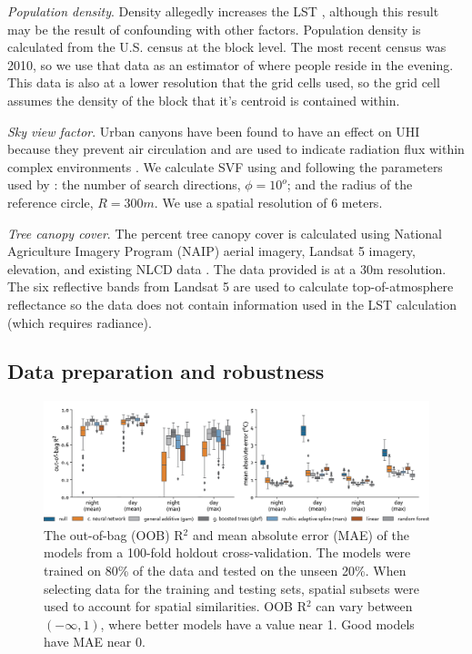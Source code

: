 \documentclass[final,3p,times,twocolumn,sort&compress]{elsarticle}
\begin{document}
\textit{Population density}. 
Density allegedly increases the LST \cite{Li2017-yl, Peng2018-cp}, although this result may be the result of confounding with other factors. 
Population density is calculated from the U.S. census at the block level. 
The most recent census was 2010, so we use that data as an estimator of where people reside in the evening. 
This data is also at a lower resolution that the grid cells used, so the grid cell assumes the density of the block that it's centroid is contained within.

\textit{Sky view factor}. Urban canyons have been found to have an effect on UHI because they prevent air circulation \cite{Landsberg1981-mq, Chun2017-mm} and are used to indicate radiation flux within complex environments \cite{Matzarakis2007-xy}. We calculate SVF using \cite{Van_doninck2018-ib} and following the parameters used by \cite{Chun2017-mm}: the number of search directions, $\phi=10^o$; and the radius of the reference circle, $R=300m$. We use a spatial resolution of 6 meters.

\textit{Tree canopy cover}. 
The percent tree canopy cover is calculated using National Agriculture Imagery Program (NAIP) aerial imagery, Landsat 5 imagery, elevation, and existing NLCD data \cite{Coulston2012-uu, Homer2015-ce}. 
The data provided is at a 30m resolution. 
The six reflective bands from Landsat 5 are used to calculate top-of-atmosphere reflectance \cite{Coulston2012-uu} so the data does not contain information used in the LST calculation (which requires radiance). 

\subsection{Data preparation and robustness}
\begin{figure}
    \centering
    \includegraphics[width=\linewidth]{fig/report/holdout_500.png}
    \caption[Holdout cross-validation results at 500 meter resolution]{
    The out-of-bag (OOB) R$^2$ and mean absolute error (MAE) of the models from a 100-fold holdout cross-validation. 
    The models were trained on 80\% of the data and tested on the unseen 20\%.
    When selecting data for the training and testing sets, spatial subsets were used to account for spatial similarities. 
    OOB R$^2$ can vary between $(-\infty, 1)$, where better models have a value near 1. 
    Good models have MAE near 0.
    }
    \label{fig:holdout_500}
\end{figure}
\end{document}
